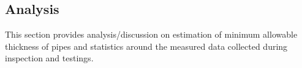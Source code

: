 
\subsection{Analysis} 
This section provides analysis/discussion on estimation of minimum allowable thickness of pipes and statistics around the measured data collected during inspection and testings.

